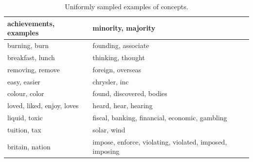 \documentclass{kais}
\begin{document}
\begin{table}
\caption{Uniformly sampled examples of concepts.}
\begin{center}
\renewcommand{\arraystretch}{1.3}
\begin{tabular*}{\textwidth}{l|l}
\hline
achievements, examples &
minority, majority \\
\hline
burning, burn & 
founding, associate \\
\hline
breakfast, lunch &
thinking, thought \\
\hline
removing, remove &
foreign, overseas\\
\hline
easy, easier &
chrysler, inc\\
\hline
colour, color &
found, discovered, bodies\\
\hline
loved, liked, enjoy, loves &
heard, hear, hearing\\
\hline
liquid, toxic &
fiscal, banking, financial, economic, gambling\\
\hline
tuition, tax &
solar, wind\\
\hline
britain, nation &
impose, enforce, violating, violated, imposed, imposing\\
\hline
\end{tabular*}
\end{center}
\label{table:random-clusters}
\end{table}
\end{document}
